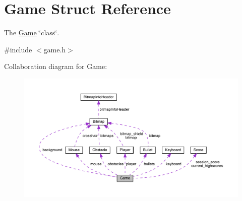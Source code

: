 \hypertarget{struct_game}{}\section{Game Struct Reference}
\label{struct_game}


The \hyperlink{struct_game}{Game} \char`\"{}class\char`\"{}.  




{\ttfamily \#include $<$game.\+h$>$}



Collaboration diagram for Game\+:
\nopagebreak
\begin{figure}[H]
\begin{center}
\leavevmode
\includegraphics[width=350pt]{struct_game__coll__graph}
\end{center}
\end{figure}
